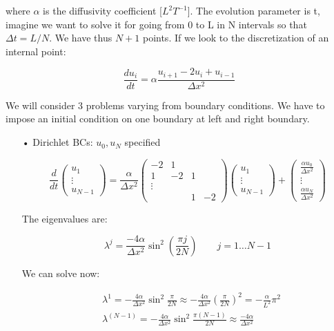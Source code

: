 where $\alpha $ is the diffusivity coefficient [$L^2T^{-1}$]. The evolution parameter is t, imagine we want to solve it for  going from 0 to L in N intervals so that $\Delta t =L/N$. We have thus $N+1$ points. If we look to the discretization of an internal point: 

\begin{equation}
\frac{d u _i}{d t} = \alpha \frac{u_{i+1}-2u_i + u_{i-1}}{\Delta x^2}
\end{equation}

We will consider 3 problems varying from boundary conditions. We have to impose an initial condition on one boundary at left and right boundary. 

\begin{itemize}
\item[•] Dirichlet BCs: $u_0,u_N$ specified

\begin{equation}
\frac{d}{dt} \left(\begin{array}{c}
u_1\\
\vdots\\
u_{N-1}
\end{array} \right) = \frac{\alpha }{\Delta x^2}
\left(
\begin{array}{cccc}
-2 & 1 &  \\
1 & -2 & 1&  \\
\vdots\\
&  & 1 & -2
\end{array}
\right)\left(\begin{array}{c}
u_1\\
\vdots\\
u_{N-1}
\end{array} \right)
+
\left(\begin{array}{c}
\frac{\alpha u_0}{\Delta x^2}\\
\vdots\\
\frac{\alpha u_N}{\Delta x^2}
\end{array} \right)
\end{equation}

The eigenvalues are: 

\begin{equation}
\lambda ^{j} = \frac{-4\alpha}{\Delta x^2}\sin ^2 \left( \frac{\pi j}{2N} \right) \qquad j = 1\dots N-1
\end{equation}

We can solve now: 

\begin{equation}
\begin{aligned}
&\lambda ^{1} = -\frac{4\alpha}{\Delta x^2} \sin ^2 \frac{\pi}{2N} \approx - \frac{4\alpha}{\Delta x^2} \left( \frac{\pi}{2N} \right)^2 = - \frac{\alpha}{L^2}\pi ^2\\
&\lambda ^{(N-1)} = -\frac{4\alpha}{\Delta x^2} \sin ^2 \frac{\pi (N-1)}{2 N}\approx \frac{-4 \alpha}{\Delta x^2} 
\end{aligned}
\end{equation}


\end{itemize}
